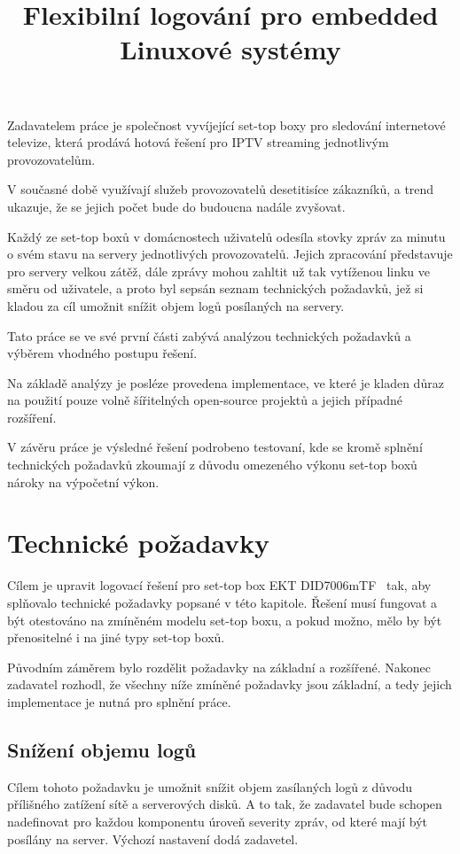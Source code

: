 \documentclass[thesis=B,czech]{FITthesis}[2012/06/26]
\title{Flexibilní logování pro embedded Linuxové systémy}
\begin{document}
\begin{introduction}
Zadavatelem práce je společnost vyvíjející set-top boxy pro sledování internetové televize, která prodává hotová řešení pro IPTV streaming jednotlivým provozovatelům.

V současné době využívají služeb provozovatelů desetitisíce zákazníků, a trend ukazuje, že se jejich počet bude do budoucna nadále zvyšovat.

Každý ze set-top boxů v domácnostech uživatelů odesíla stovky zpráv za minutu o svém stavu na servery jednotlivých provozovatelů. Jejich zpracování představuje pro servery velkou zátěž, dále zprávy mohou zahltit už tak vytíženou linku ve směru od uživatele, a proto byl sepsán seznam technických požadavků, jež si kladou za cíl umožnit snížit objem logů posílaných na servery.

Tato práce se ve své první části zabývá analýzou technických požadavků a výběrem vhodného postupu řešení.
 
Na základě analýzy je posléze provedena implementace, ve které je kladen důraz na použití pouze volně šířitelných open-source projektů a jejich případné rozšíření.
 
V závěru práce je výsledné řešení podrobeno testovaní, kde se kromě splnění technických požadavků zkoumají z důvodu omezeného výkonu set-top boxů nároky na výpočetní výkon.
\end{introduction}

\chapter{Technické požadavky}
Cílem je upravit logovací řešení pro set-top box EKT DID7006mTF~\cite{ekt7006} tak, aby splňovalo technické požadavky popsané v této kapitole. Řešení musí fungovat a být otestováno na zmíněném modelu set-top boxu, a pokud možno, mělo by být přenositelné i na jiné typy set-top boxů.

Původním záměrem bylo rozdělit požadavky na základní a rozšířené. Nakonec zadavatel rozhodl, že všechny níže zmíněné požadavky jsou základní, a tedy jejich implementace je nutná pro splnění práce.

\section*{Snížení objemu logů}
Cílem tohoto požadavku je umožnit snížit objem zasílaných logů z důvodu přílišného zatížení sítě a serverových disků. A to tak, že zadavatel bude schopen nadefinovat pro každou komponentu úroveň severity zpráv, od které mají být posílány na server. Výchozí nastavení dodá zadavetel.
\end{document}
